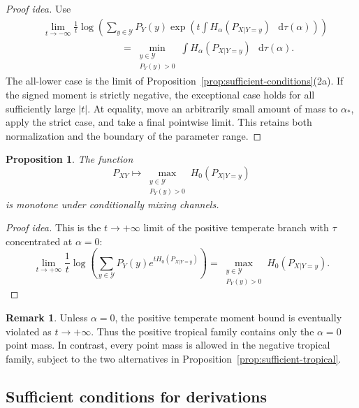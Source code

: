 \documentclass[11pt]{article}
\newtheorem{proposition}[theorem]{Proposition}
\theoremstyle{definition}
\newtheorem{remark}[theorem]{Remark}
\newcommand{\Y}{\mathcal{Y}}
\def\d{\mathop{}\!\mathrm{d}}
\begin{document}
\begin{proof}[Proof idea]
Use
\begin{align}
\label{eq:limit-tropical}
&\lim_{t\to-\infty}\frac1t\log\!\left(
\sum_{y\in\Y}P_Y(y)
\exp\!\left(t\int H_\alpha(P_{X|Y=y})\,\d\tau(\alpha)\right)
\right)\\
&\hspace{8em}=
\min_{\substack{y\in\Y\\P_Y(y)>0}}
\int H_\alpha(P_{X|Y=y})\,\d\tau(\alpha).
\end{align}
The all-lower case is the limit of Proposition~\ref{prop:sufficient-conditions}(2a).
If the signed moment is strictly negative, the exceptional case holds for all
sufficiently large $|t|$.  At equality, move an arbitrarily small amount of mass
to $\alpha_*$, apply the strict case, and take a final pointwise limit.  This
retains both normalization and the boundary of the parameter range.
\end{proof}

\begin{proposition}
\label{prop:sufficient-tropical-positive}
The function
\begin{equation}
P_{XY}\longmapsto
\max_{\substack{y\in\Y\\P_Y(y)>0}}H_0(P_{X|Y=y})
\end{equation}
is monotone under conditionally mixing channels.
\end{proposition}

\begin{proof}[Proof idea]
This is the $t\to+\infty$ limit of the positive temperate branch with
$\tau$ concentrated at $\alpha=0$:
\begin{equation}
\lim_{t\to+\infty}\frac1t\log\!\left(
\sum_{y\in\Y}P_Y(y)e^{tH_0(P_{X|Y=y})}\right)
=\max_{\substack{y\in\Y\\P_Y(y)>0}}H_0(P_{X|Y=y}).
\end{equation}
\end{proof}

\begin{remark}
Unless $\alpha=0$, the positive temperate moment bound is eventually violated as
$t\to+\infty$.  Thus the positive tropical family contains only the
$\alpha=0$ point mass.  In contrast, every point mass is allowed in the negative
tropical family, subject to the two alternatives in
Proposition~\ref{prop:sufficient-tropical}.
\end{remark}

\subsection{Sufficient conditions for derivations}
\end{document}

